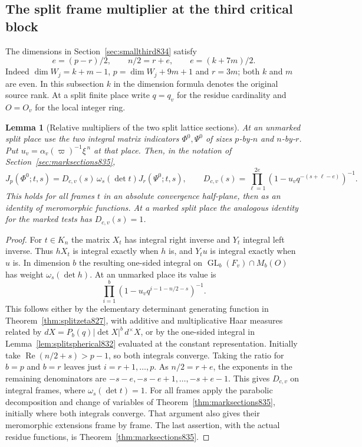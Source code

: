 \documentclass[a4paper,11pt]{article}
\newtheorem{lemma}[proposition]{Lemma}
\theoremstyle{definition}
\theoremstyle{remark}
\numberwithin{equation}{section}
\begin{document}
\subsection{The split frame multiplier at the third critical block}
\label{sec:thirdsplitprod836}
The dimensions in Section~\ref{sec:smallthird834} satisfy
\[
       e=(p-r)/2,\qquad n/2=r+e,\qquad e=(k+7m)/2 .
\]
Indeed \(\dim W_j=k+m-1\), \(p=\dim W_j+9m+1\) and
\(r=3m\); both \(k\) and \(m\) are even. In this subsection
\(k\) in the dimension formula denotes the original source
rank. At a split finite place write \(q=q_v\) for the residue
cardinality and \(O=O_v\) for the local integer ring.

\begin{lemma}[Relative multipliers of the two split lattice sections]
\leavevmode\label{lem:thirdsplitvacuum836}
At an unmarked split place use the two integral matrix
indicators \(\Phi^0,\Psi^0\) of sizes \(p\)-by-\(n\)
and \(n\)-by-\(r\). Put
\(u_v=\alpha_v(\varpi)^{-1}\xi^{\,n}\) at that place.
Then, in the notation of Section~\ref{sec:marksections835},
\[
 J_p(\Phi^0;t,s)=D_{c,v}(s)\,\omega_s(\det t)J_r(\Psi^0;t,s),
 \qquad
 D_{c,v}(s)=\prod_{\ell=1}^{2e}
            (1-u_v q^{-(s+\ell-e)})^{-1}.
\]
This holds for all frames \(t\) in an absolute convergence
half-plane, then as an identity of meromorphic functions.
At a marked split place the analogous identity for the
marked tests has \(D_{c,v}(s)=1\).
\end{lemma}
\begin{proof}
For \(t\in K_n\) the matrix \(X_t\) has integral right
inverse and \(Y_t\) integral left inverse. Thus \(hX_t\)
is integral exactly when \(h\) is, and \(Y_tu\) is integral
exactly when \(u\) is. In dimension \(b\) the resulting
one-sided integral on \(\operatorname{GL}_b(F_v)\cap M_b(O)\)
has weight \(\omega_s(\det h)\). At an unmarked place its
value is
\[
       \prod_{i=1}^b(1-u_v q^{i-1-n/2-s})^{-1}.
\]
This follows either by the elementary determinant generating
function in Theorem~\ref{thm:splitzeta827}, with additive
and multiplicative Haar measures related by
\(dX=P_b(q)|\det X|^b\,d^\times X\), or by the one-sided
integral in Lemma~\ref{lem:splitspherical832} evaluated at
the constant representation. Initially take
\(\operatorname{Re}(n/2+s)>p-1\), so both integrals converge.
Taking the ratio for \(b=p\) and \(b=r\) leaves just
\(i=r+1,\ldots,p\). As \(n/2=r+e\), the exponents in the
remaining denominators are \(-s-e,-s-e+1,\ldots,-s+e-1\).
This gives \(D_{c,v}\) on integral frames, where
\(\omega_s(\det t)=1\). For all frames apply the parabolic
decomposition and change of variables of
Theorem~\ref{thm:marksections835}, initially where both
integrals converge. That argument also gives their meromorphic
extensions frame by frame. The last assertion, with the
actual residue functions, is Theorem~\ref{thm:marksections835}.
\end{proof}
\end{document}
